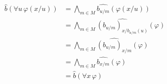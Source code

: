 \begin{align*}
  \hat b(\forall u \, \varphi(x/u))
  & =
  \bigwedge_{m \in M} \widehat{b_{u/m}}(\varphi(x/u)) \\
  & =
  \bigwedge_{m \in M} \widehat{(b_{u/m})_{x/b_{u/m}(u)}}(\varphi) \\
  & =
  \bigwedge_{m \in M} \widehat{(b_{u/m})_{x/m}}(\varphi) \\
  & =
  \bigwedge_{m \in M} \widehat{b_{x/m}}(\varphi) \\
  & =
  \hat b(\forall x \, \varphi)
\end{align*}